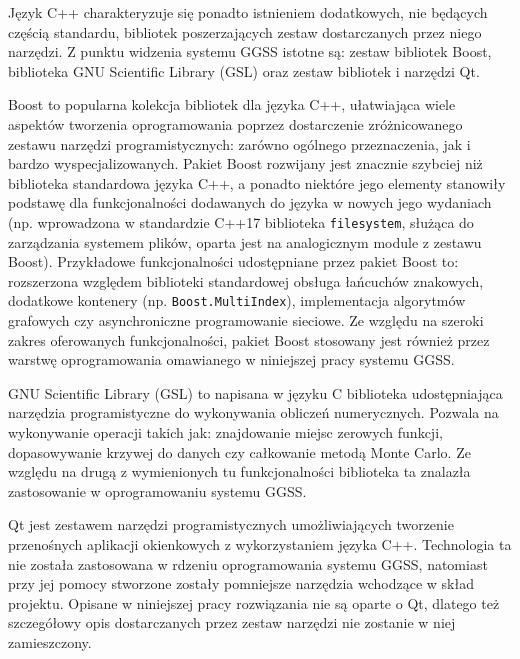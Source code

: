 

\clearpage
Język C++ charakteryzuje się ponadto istnieniem dodatkowych, nie będących częścią standardu, bibliotek poszerzających zestaw dostarczanych przez niego narzędzi. Z punktu widzenia systemu GGSS istotne są: zestaw bibliotek Boost, biblioteka GNU Scientific Library (GSL) oraz zestaw bibliotek i narzędzi Qt.

Boost to popularna kolekcja bibliotek dla języka C++, ułatwiająca wiele aspektów tworzenia oprogramowania poprzez dostarczenie zróżnicowanego zestawu narzędzi programistycznych: zarówno ogólnego przeznaczenia, jak i bardzo wyspecjalizowanych. Pakiet Boost rozwijany jest znacznie szybciej niż biblioteka standardowa języka C++, a ponadto niektóre jego elementy stanowiły podstawę dla funkcjonalności dodawanych do języka w nowych jego wydaniach (np. wprowadzona w standardzie C++17 biblioteka \lstinline{filesystem}, służąca do zarządzania systemem plików, oparta jest na analogicznym module z zestawu Boost). Przykładowe funkcjonalności udostępniane przez pakiet Boost to: rozszerzona względem biblioteki standardowej obsługa łańcuchów znakowych, dodatkowe kontenery (np. \lstinline{Boost.MultiIndex}), implementacja algorytmów grafowych czy asynchroniczne programowanie sieciowe. Ze względu na szeroki zakres oferowanych funkcjonalności, pakiet Boost stosowany jest również przez warstwę oprogramowania omawianego w niniejszej pracy systemu GGSS.

GNU Scientific Library (GSL) to napisana w języku C biblioteka udostępniająca narzędzia programistyczne do wykonywania obliczeń numerycznych. Pozwala na wykonywanie operacji takich jak: znajdowanie miejsc zerowych funkcji, dopasowywanie krzywej do danych czy całkowanie metodą Monte Carlo. Ze względu na drugą z wymienionych tu funkcjonalności biblioteka ta znalazła zastosowanie w oprogramowaniu systemu GGSS.

Qt jest zestawem narzędzi programistycznych umożliwiających tworzenie przenośnych aplikacji okienkowych z wykorzystaniem języka C++. Technologia ta nie została zastosowana w rdzeniu oprogramowania systemu GGSS, natomiast przy jej pomocy stworzone zostały pomniejsze narzędzia wchodzące w skład projektu. Opisane w niniejszej pracy rozwiązania nie są oparte o Qt, dlatego też szczegółowy opis dostarczanych przez zestaw narzędzi nie zostanie w niej zamieszczony.



